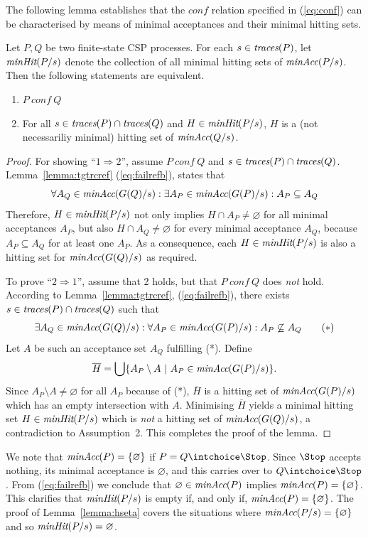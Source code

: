 The following lemma establishes that the $conf$ relation specified in
(\ref{eq:conf}) can be characterised by means of minimal acceptances and
their minimal hitting sets.
%
\begin{lemma}
\label{lemma:hseta}
Let $P, Q$ be two finite-state CSP processes.
For each $s\in\text{\it traces}(P)$,
let $\text{\it minHit}(P/s)$ denote the
collection of all minimal hitting sets of $\text{\it minAcc}(P/s)$.
Then the following statements are equivalent.
\begin{enumerate}
\item $P\ conf\ Q$

\item For all $s\in\text{\it traces}(P)\cap \text{\it traces}(Q)$ and $H \in  \text{\it minHit}(P/s)$, $H$ is
a (not necessariliy minimal) hitting set of $\text{\it minAcc}(Q/s)$.
\end{enumerate}
\end{lemma}
\begin{proof}
For showing ``$1 \Rightarrow 2$'', assume   $P\ conf\ Q$ and $s\in\text{\it traces}(P)\cap
\text{\it traces}(Q)$. Lemma~\ref{lemma:tgtrcref} (\ref{eq:failrefb}), states that
\[
\forall A_Q\in\text{\it minAcc}(G(Q)/s):
\exists A_P\in\text{\it minAcc}(G(P)/s): A_P\subseteq A_Q
\]
Therefore, $H \in  \text{\it minHit}(P/s)$ not only implies $H\cap A_P\neq\varnothing$
for all minimal acceptances $A_P$, but also $H\cap A_Q\neq\varnothing$ for
every minimal acceptance $A_Q$, because $A_P\subseteq A_Q$ for at least one
$A_P$. As a consequence, each $H \in \text{\it minHit}(P/s)$ is also a hitting set for
$\text{\it minAcc}(G(Q)/s)$ as required.

To prove ``$2 \Rightarrow 1$'', assume that 2 holds, but that $P\ conf\ Q$
does {\it not} hold. According to Lemma~\ref{lemma:tgtrcref},
(\ref{eq:failrefb}), there exists $s\in\text{\it traces}(P)\cap \text{\it traces}(Q)$ such that
\[
\exists A_Q\in\text{\it minAcc}(G(Q)/s): \forall A_P\in\text{\it minAcc}(G(P)/s): A_P\not\subseteq A_Q
\qquad (*)
\]
Let $A$ be such an acceptance set $A_Q$ fulfilling (*).
Define
\[
\overline H = \bigcup\{ A_P \setminus A~|~A_P\in\text{\it minAcc}(G(P)/s) \}.
\]
Since $A_P \setminus A \neq\varnothing$ for all $A_P$ because of (*),
$\overline H$ is a hitting set of $\text{\it minAcc}(G(P)/s)$ which has an  empty
intersection with $A$.
Minimising $\overline H$ yields   a minimal hitting set $H\in
\text{\it minHit}(P/s)$ which is {\it not} a hitting set of $\text{\it minAcc}(G(Q)/s)$, a
contradiction to Assumption~2. This completes the proof of the lemma. \xbox
\end{proof}
%
We note that $\text{\it minAcc}(P) = \{ \varnothing \}$ if $P = Q\intchoice \Stop$.
Since $\Stop$ accepts nothing, its minimal acceptance is $\varnothing$, and
this carries over to $Q\intchoice \Stop$.  From (\ref{eq:failrefb}) we
conclude that $\varnothing\in\text{\it minAcc}(P)$ implies $\text{\it minAcc}(P) = \{
\varnothing \}$. This clarifies that $\text{\it minHit}(P/s)$ is empty if, and only
if, $\text{\it minAcc}(P) = \{ \varnothing \}$. The proof of Lemma~\ref{lemma:hseta}
covers the situations where $\text{\it minAcc}(P/s) = \{ \varnothing \}$ and so
$\text{\it minHit}(P/s) = \varnothing$.
